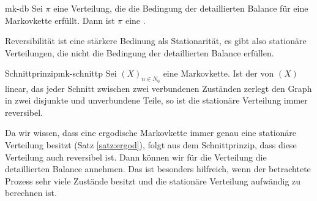 \begin{theorem}{}{mk-db}
Sei $\pi$ eine Verteilung, die die Bedingung der detaillierten Balance
für eine Markovkette erfüllt. Dann ist $\pi$ eine
.
\end{theorem}

Reversibilität ist eine stärkere Bedinung als Stationarität, es gibt also
stationäre Verteilungen, die nicht die Bedingung der detaillierten Balance
erfüllen.

\begin{theorem}{Schnittprinzip}{mk-schnittp}
Sei $(X)_{n\in N_0}$ eine  Markovkette. Ist der
 von $(X)$ linear, das jeder Schnitt
zwischen zwei verbundenen Zuständen zerlegt den Graph in zwei disjunkte und
unverbundene Teile, so ist die stationäre Verteilung immer reversibel.
\end{theorem}

Da wir wissen, dass eine ergodische Markovkette immer genau eine stationäre
Verteilung besitzt (Satz \ref{satz:ergod}), folgt aus dem Schnittprinzip, dass
diese Verteilung auch reversibel ist. Dann können wir für die Verteilung die
detaillierten Balance annehmen. Das ist besonders hilfreich, wenn der
betrachtete Prozess sehr viele Zustände besitzt und die stationäre Verteilung
aufwändig zu berechnen ist.


